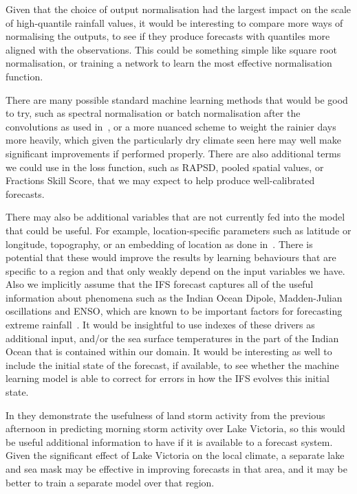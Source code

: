 \documentclass{article}
\begin{document}



Given that the choice of output normalisation had the largest impact on the scale of high-quantile rainfall values, it would be interesting to compare more ways of normalising the outputs, to see if they produce forecasts with quantiles more aligned with the observations. This could be something simple like square root normalisation, or training a network to learn the most effective normalisation function. 

There are many possible standard machine learning methods that would be good to try, such as spectral normalisation or batch normalisation after the convolutions as used in~\cite{ravuri_skilful_2021}, or a more nuanced scheme to weight the rainier days more heavily, which given the particularly dry climate seen here may well make significant improvements if performed properly. There are also additional terms we could use in the loss function, such as RAPSD, pooled spatial values, or Fractions Skill Score, that we may expect to help produce well-calibrated forecasts. 

There may also be additional variables that are not currently fed into the model that could be useful. For example, location-specific parameters such as latitude or longitude, topography, or an embedding of location as done in~\cite{rasp_neural_2018}. There is potential that these would improve the results by learning behaviours that are specific to a region and that only weakly depend on the input variables we have. Also we implicitly assume that the IFS forecast captures all of the useful information about phenomena such as the Indian Ocean Dipole, Madden-Julian oscillations and ENSO, which are known to be important factors for forecasting extreme rainfall~\citep{wainwright_extreme_2021, palmer_drivers_2023}. It would be insightful to use indexes of these drivers as additional input, and/or the sea surface temperatures in the part of the Indian Ocean that is contained within our domain. It would be interesting as well to include the initial state of the forecast, if available, to see whether the machine learning model is able to correct for errors in how the IFS evolves this initial state.


In \cite{thiery_early_2017} they demonstrate the usefulness of land storm activity from the previous afternoon in predicting morning storm activity over Lake Victoria, so this would be useful additional information to have if it is available to a forecast system. Given the significant effect of Lake Victoria on the local climate, a separate lake and sea mask may be effective in improving forecasts in that area, and it may be better to train a separate model over that region.
\end{document}
